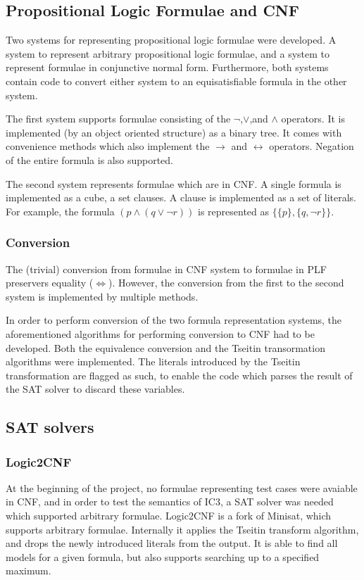 \documentclass[a4paper]{article}
\begin{document}
\subsection{Propositional Logic Formulae and CNF}
Two systems for representing propositional logic formulae were developed. A system to represent arbitrary propositional logic formulae, and a system to represent formulae in conjunctive normal form. Furthermore, both systems contain code to convert either system to an equisatisfiable formula in the other system.

The first system supports formulae consisting of the $\lnot$,$\lor$,and $\land$ operators. It is implemented (by an object oriented structure) as a binary tree. It comes with convenience methods which also implement the $\rightarrow$ and $\leftrightarrow$ operators. Negation of the entire formula is also supported.

The second system represents formulae which are in CNF. A single formula is implemented as a cube, a set clauses. A clause is implemented as a set of literals. For example, the formula $(p \land (q \lor \lnot r))$ is represented as $\{\{p\},\{q,\lnot r\}\}$.

\subsubsection{Conversion}
The (trivial) conversion from formulae in CNF system to formulae in PLF preservers equality ($\Leftrightarrow$). However, the conversion from the first to the second system is implemented by multiple methods.

In order to perform conversion of the two formula representation systems, the aforementioned algorithms for performing conversion to CNF had to be developed. Both the equivalence conversion and the Tseitin transormation algorithms were implemented.  The literals introduced by the Tseitin transformation are flagged as such, to enable the code which parses the result of the SAT solver to discard these variables.

\subsection{SAT solvers}
\subsubsection{Logic2CNF}
At the beginning of the project, no formulae representing test cases were avaiable in CNF, and in order to test the semantics of IC3, a SAT solver was needed which supported arbitrary formulae. Logic2CNF is a fork of Minisat, which supports arbitrary formulae. Internally it applies the Tseitin transform algorithm, and drops the newly introduced literals from the output. It is able to find all models for a given formula, but also supports searching up to a specified maximum.
\end{document}
